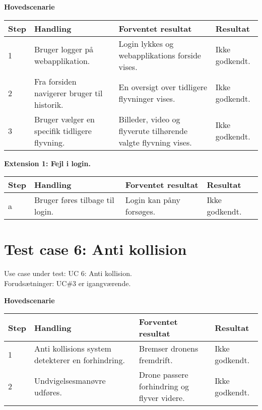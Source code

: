 \textbf{Hovedscenarie}
\begin{table}[H]
	\centering
		\begin{tabular}{|l|p{5 cm}|p{5 cm}|p{2.5 cm}|} 
		\hline
			\textbf{Step} & \textbf{Handling} & \textbf{Forventet resultat} & \textbf{Resultat} \\ \hline
			1 & Bruger logger på \newline webapplikation. & Login lykkes og webapplikations forside vises. & Ikke godkendt.  \\ \hline
			2 & Fra forsiden navigerer \newline bruger til historik. & En oversigt over tidligere \newline flyvninger vises. & Ikke godkendt. \\ \hline
			3 & Bruger vælger en specifik \newline tidligere flyvning. &  Billeder, video og flyverute \newline tilhørende valgte flyvning \newline vises. &  Ikke godkendt. \\ \hline			
		\end{tabular}
\end{table}

\textbf{Extension 1: Fejl i login.}
\begin{table}[H]
	\centering
		\begin{tabular}{|l|p{5 cm}|p{5 cm}|p{2.5 cm}|} 
		\hline
			\textbf{Step} & \textbf{Handling} & \textbf{Forventet resultat} & \textbf{Resultat} \\ \hline
			a & Bruger føres tilbage til login. & Login kan påny forsøges. & Ikke godkendt. \\ \hline
		\end{tabular}
\end{table}

\section{Test case 6: Anti kollision}
Use case under test: UC 6: Anti kollision.\\
Forudsætninger:	UC\#3 er igangværende.

\textbf{Hovedscenarie}
\begin{table}[H]
	\centering
		\begin{tabular}{|l|p{5 cm}|p{5 cm}|p{2.5 cm}|} 
		\hline
			\textbf{Step} & \textbf{Handling} & \textbf{Forventet resultat} & \textbf{Resultat} \\ \hline
			1 & Anti kollisions system \newline detekterer en forhindring. & Bremser dronens fremdrift. & Ikke godkendt. \\ \hline
			2 & Undvigelsesmanøvre udføres. & Drone passere forhindring og flyver videre. & Ikke godkendt.\\ \hline			
		\end{tabular}
\end{table}

